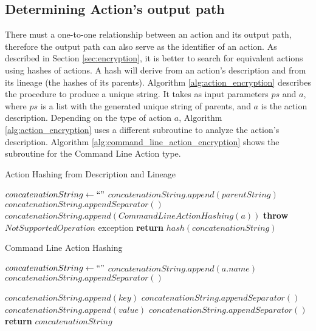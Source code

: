 \subsection{Determining Action's output path}
There must a one-to-one relationship between an action and its output path, therefore the output path can also serve as the identifier of an action. As described in Section \ref{sec:encryption}, it is better to search for equivalent actions using hashes of actions. A hash will derive from an action's description and from its lineage (the hashes of its parents). Algorithm \ref{alg:action_encryption} describes the procedure to produce a unique string.  It takes as input parameters $ps$ and $a$, where $ps$ is a list with the generated unique string of parents, and $a$ is the action description.  Depending on the type of action $a$, Algorithm \ref{alg:action_encryption} uses a different subroutine to analyze the action's description. Algorithm \ref{alg:command_line_action_encryption} shows the subroutine for the Command Line Action type.

\begin{algorithm}
\begin{singlespace}
\caption{Action Hashing from Description and Lineage}
\label{alg:action_encryption}
\begin{algorithmic}[1]
\State $concatenationString \gets ``"$
	\State $concatenationString.append(parentString)$
	\State $concatenationString.appendSeparator()$
\EndFor
{}
	\State $concatenationString.append(CommandLineActionHashing(a))$
\Else
	\State \textbf{throw} $NotSupportedOperation$ exception
\EndIf
\State \textbf{return} $hash(concatenationString)$

\EndProcedure
\end{algorithmic}
\end{singlespace}
\end{algorithm}

\begin{algorithm}
\begin{singlespace}
\caption{Command Line Action Hashing}
\label{alg:command_line_action_encryption}
\begin{algorithmic}[1]
\State $concatenationString \gets ``"$
\State $concatenationString.append(a.name)$
\State $concatenationString.appendSeparator()$

	\State $concatenationString.append(key)$
	\State $concatenationString.appendSeparator()$
	\State $concatenationString.append(value)$
	\State $concatenationString.appendSeparator()$
\EndFor
	\State \textbf{return} $concatenationString$
\EndProcedure
\end{algorithmic}
\end{singlespace}
\end{algorithm}

